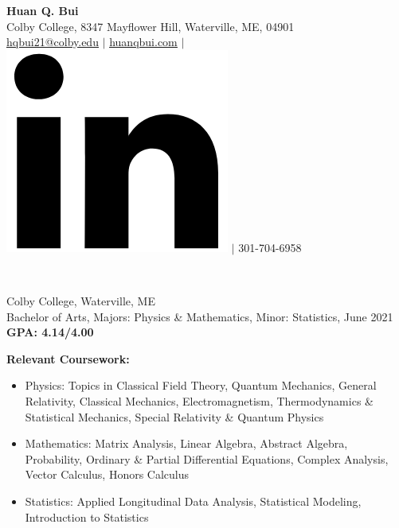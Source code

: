 \documentclass[letter, 9pt]{article}
\newcommand{\longunderline}[1]{\uline{#1\hfill\mbox{}}}
\begin{document}
	\begin{center}
		{\Large\textbf{Huan Q. Bui}}\\
		\smallskip
		Colby College, 8347 Mayflower Hill, Waterville, ME, 04901\\ \href{mailto:hqbui21@colby.edu}{\underline{hqbui21@colby.edu}} $\vert$ \href{https://huanqbui.com}{\underline{huanqbui.com}} $\vert$ \href{https://www.linkedin.com/in/huan-bui/}{\includegraphics[scale=0.04]{linkedin_logo.PNG}} $\vert$ 301-704-6958
	\end{center}
	\noindent \longunderline{\normalsize{{}}}\\
	\vspace{-7pt}
	
	
			\noindent Colby College, Waterville, ME\\
			Bachelor of Arts, {Majors}: Physics \& Mathematics, {Minor}: Statistics, June 2021 \hfill \textbf{GPA: 4.14/4.00}\\
			\vspace{-7pt}

			\noindent \textbf{Relevant Coursework:} 
			\begin{itemize}[noitemsep, nolistsep]
				\item Physics: Topics in Classical Field Theory, Quantum Mechanics, General Relativity, Classical Mechanics, Electromagnetism, Thermodynamics \& Statistical Mechanics, Special Relativity \& Quantum Physics
				\item Mathematics: Matrix Analysis, Linear Algebra, Abstract Algebra, Probability, Ordinary \& Partial Differential Equations, Complex Analysis, Vector Calculus, Honors Calculus
				\item Statistics: Applied Longitudinal Data Analysis, Statistical Modeling, Introduction to Statistics \\
			\end{itemize}
 
\end{document}
